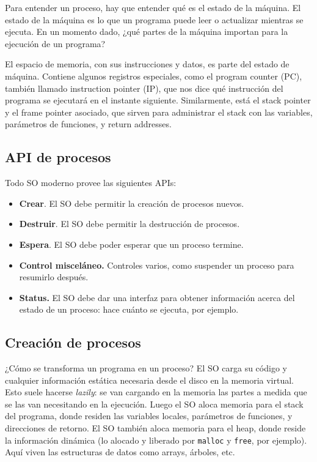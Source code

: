 \documentclass[12pt]{article}
\theoremstyle{definition}
\begin{document}
Para entender un proceso, hay que entender qué es el estado de la máquina. 
El estado de la máquina es lo que un programa puede leer o actualizar mientras
se ejecuta. En un momento dado, ¿qué partes de la máquina importan para la
ejecución de un programa? 

El espacio de memoria, con sus instrucciones y datos, es parte del estado de
máquina. Contiene algunos registros especiales, como el program counter (PC),
también llamado instruction pointer (IP), que nos dice qué instrucción del
programa se ejecutará en el instante siguiente. Similarmente, está el stack
pointer y el frame pointer asociado, que sirven para administrar el stack con
las variables, parámetros de funciones, y return addresses. 

\subsection{API de procesos}

Todo SO moderno provee las siguientes APIs:

\begin{itemize}
    \item \textbf{Crear}. El SO debe permitir la creación de procesos nuevos. 
    \item \textbf{Destruir}. El SO debe permitir la destrucción de procesos. 
    \item \textbf{Espera}. El SO debe poder esperar que un proceso termine. 
    \item \textbf{Control misceláneo.} Controles varios, como suspender un
        proceso para resumirlo después. 
    \item \textbf{Status.} El SO debe dar una interfaz para obtener información
        acerca del estado de un proceso: hace cuánto se ejecuta, por ejemplo.
\end{itemize}


\subsection{Creación de procesos}

¿Cómo se transforma un programa en un proceso? El SO carga su código y cualquier
información estática necesaria desde el disco en la memoria virtual. Esto suele
hacerse \textit{lazily}: se van cargando en la memoria las partes a medida que
se las van necesitando en la ejecución. Luego el SO aloca memoria para el stack del
programa, donde residen las variables locales, parámetros de funciones, y
direcciones de retorno. El SO también aloca memoria para el heap, donde reside
la información dinámica (lo alocado y liberado por \texttt{malloc} y
\texttt{free}, por ejemplo). Aquí viven las estructuras de datos como arrays,
árboles, etc. 
\end{document}
